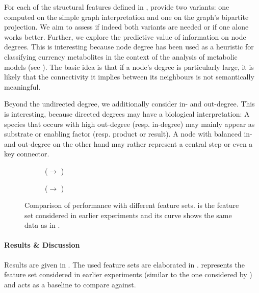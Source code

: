\documentclass[
	fontsize=10pt, %
	twoside=true, %
	secnumdepth=1, %
  toc=indentunnumbered %
]{kaobook}
\begin{document}
For each of the structural features defined in , \nielsen{}
provide two variants: one computed on the simple graph interpretation and one on
the graph's bipartite projection. We aim to assess if indeed both variants are
needed or if one alone works better.
%
Further, we explore the predictive value of information on node degrees.
This is interesting because node degree has been used as a heuristic for
classifying currency metabolites in the context of the analysis of metabolic
models (see ). The basic idea is that if a node's
degree is particularly large, it is likely that the connectivity it implies
between its neighbours is not semantically meaningful.

Beyond the undirected degree, we additionally consider in- and out-degree. This
is interesting, because directed degrees may have a biological interpretation: A
species that occurs with high out-degree (resp. in-degree) may mainly appear as
substrate or enabling factor (resp. product or result). A node with balanced in-
and out-degree on the other hand may rather represent a central step or even a
key connector.


\begin{figure}[h]
  \centering
  \begin{subfigure}{0.48\linewidth}
    \caption{(\ADLast $\rightarrow$ \PDMap)}
  \end{subfigure}
  \begin{subfigure}{0.48\linewidth}
    \caption{(\ADLast $\rightarrow$ \ReconMap{})}
  \end{subfigure}
  \caption[Comparison of performance with different feature sets.]{Comparison of
    performance with different feature sets.  is the
    feature set considered in earlier experiments and its curve shows the same
    data as in .}
  \label{fig:feature-importance}
\end{figure}


\paragraph{Results \& Discussion} Results are given in
. The used feature sets are elaborated in
.  represents the feature set
considered in earlier experiments (similar to the one considered by \nielsen{})
and acts as a baseline to compare against.
\end{document}
